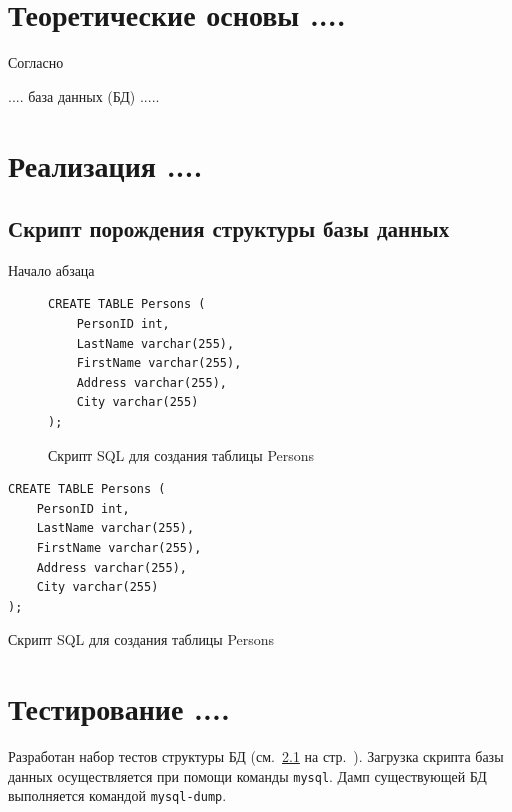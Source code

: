 \documentclass[14pt,final]{report}
\begin{document}
\chapter{Теоретические основы ....}

Согласно \cite{bratko90}

.... база данных (БД) .....

\chapter{Реализация ....}

\section{Скрипт порождения структуры базы данных}
\label{sec:struct-bd}

Начало абзаца


\begin{figure}[htbp]
\begin{center}
\begin{verbatim}
CREATE TABLE Persons (
    PersonID int,
    LastName varchar(255),
    FirstName varchar(255),
    Address varchar(255),
    City varchar(255)
);
\end{verbatim}
\end{center}
\caption{Скрипт SQL для создания таблицы Persons}\label{fig:crate-table}
\end{figure}


\begin{listing}[htbp]
\begin{center}

{\footnotesize
\begin{verbatim}
CREATE TABLE Persons (
    PersonID int,
    LastName varchar(255),
    FirstName varchar(255),
    Address varchar(255),
    City varchar(255)
);
\end{verbatim}}

\end{center}
\caption{Скрипт SQL для создания таблицы Persons}\label{fig:crate-table}
\end{listing}

\chapter{Тестирование ....}

Разработан набор тестов структуры БД (см.~\ref{sec:struct-bd} на стр.~\pageref{sec:struct-bd}).   Загрузка скрипта базы данных осуществляется при помощи команды \texttt{mysql}.  Дамп существующей БД выполняется командой \verb|mysql-dump|.
\end{document}
